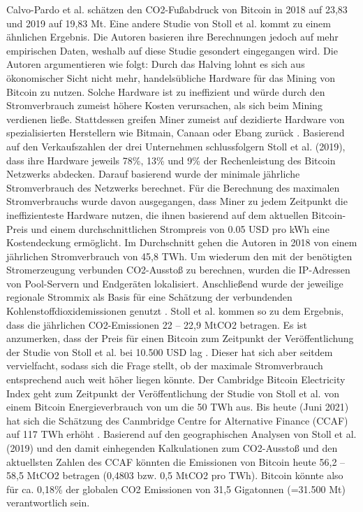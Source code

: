 Calvo-Pardo et al. \cite{calvo-pardo_machine_2020} schätzen den CO2-Fußabdruck von Bitcoin in 2018 auf 23,83 und 2019 auf 19,83 Mt. Eine andere Studie von Stoll et al. \cite{stoll_carbon_2019} kommt zu einem ähnlichen Ergebnis. Die Autoren basieren ihre Berechnungen jedoch auf mehr empirischen Daten, weshalb auf diese Studie gesondert eingegangen wird. Die Autoren argumentieren wie folgt: Durch das Halving lohnt es sich aus ökonomischer Sicht nicht mehr, handelsübliche Hardware für das Mining von Bitcoin zu nutzen. Solche Hardware ist zu ineffizient und würde durch den Stromverbrauch zumeist höhere Kosten verursachen, als sich beim Mining verdienen ließe. Stattdessen greifen Miner zumeist auf dezidierte Hardware von spezialisierten Herstellern wie Bitmain, Canaan oder Ebang zurück \cite{stoll_carbon_2019}. Basierend auf den Verkaufszahlen der drei Unternehmen schlussfolgern Stoll et al. (2019), dass ihre Hardware jeweils 78\%, 13\% und 9\% der Rechenleistung des Bitcoin Netzwerks abdecken. Darauf basierend wurde der minimale jährliche Stromverbrauch des Netzwerks berechnet. Für die Berechnung des maximalen Stromverbrauchs wurde davon ausgegangen, dass Miner zu jedem Zeitpunkt die ineffizienteste Hardware nutzen, die ihnen basierend auf dem aktuellen Bitcoin-Preis und einem durchschnittlichen Strompreis von 0.05 USD pro kWh eine Kostendeckung ermöglicht. Im Durchschnitt gehen die Autoren in 2018 von einem jährlichen Stromverbrauch von 45,8 TWh. Um wiederum den mit der benötigten Stromerzeugung verbunden CO2-Ausstoß zu berechnen, wurden die IP-Adressen von Pool-Servern und Endgeräten lokalisiert. Anschließend wurde der jeweilige regionale Strommix als Basis für eine Schätzung der verbundenden Kohlenstoffdioxidemissionen genutzt \cite{stoll_carbon_2019}. Stoll et al. \cite{stoll_carbon_2019} kommen so zu dem Ergebnis, dass die jährlichen CO2-Emissionen 22 – 22,9 MtCO2 betragen. Es ist anzumerken, dass der Preis für einen Bitcoin zum Zeitpunkt der Veröffentlichung der Studie von Stoll et al. \cite{stoll_carbon_2019} bei 10.500 USD lag \cite{noauthor_coindesk_2021}. Dieser hat sich aber seitdem vervielfacht, sodass sich die Frage stellt, ob der maximale Stromverbrauch entsprechend auch weit höher liegen könnte. Der Cambridge Bitcoin Electricity Index geht zum Zeitpunkt der Veröffentlichung der Studie von Stoll et al. \cite{stoll_carbon_2019} von einem Bitcoin Energieverbrauch von um die 50 TWh aus. Bis heute (Juni 2021) hat sich die Schätzung des Canmbridge Centre for Alternative Finance (CCAF) auf 117 TWh erhöht \cite{cambridge_cambridge_2021}. Basierend auf den geographischen Analysen von Stoll et al. (2019) und den damit einhegenden Kalkulationen zum CO2-Ausstoß und den aktuellsten Zahlen des CCAF könnten die Emissionen von Bitcoin heute 56,2 – 58,5 MtCO2 betragen (0,4803 bzw. 0,5 MtCO2 pro TWh). Bitcoin könnte also für ca. 0,18\% der globalen CO2 Emissionen von 31,5 Gigatonnen (=31.500 Mt) \cite{IEA_global_2021} verantwortlich sein.

